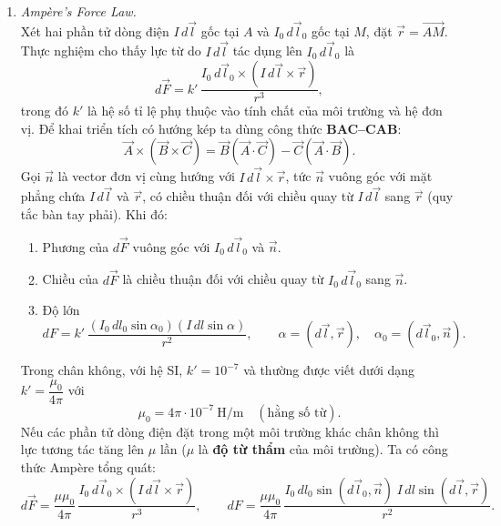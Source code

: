 \begin{enumerate}
\item \textit{Ampère's Force Law.}\\
Xét hai phần tử dòng điện $I\,d\vec{l}$ gốc tại $A$ và $I_0\,d\vec{l}_0$ gốc tại $M$, đặt $\vec{r} = \vec{AM}$. Thực nghiệm cho thấy lực từ do $I\,d\vec{l}$ tác dụng lên $I_0\,d\vec{l}_0$ là
\begin{equation}\label{eq:ampere-force}
d\vec{F} = k'\,\frac{I_0\,d\vec{l}_0 \times \left(I\,d\vec{l} \times \vec{r}\right)}{r^3},
\end{equation}
trong đó $k'$ là hệ số tỉ lệ phụ thuộc vào tính chất của môi trường và hệ đơn vị. Để khai triển tích có hướng kép ta dùng công thức \textbf{BAC--CAB}:
\[
\vec{A} \times (\vec{B} \times \vec{C}) = \vec{B}(\vec{A}\cdot\vec{C}) - \vec{C}(\vec{A}\cdot\vec{B}).
\]
Gọi $\vec{n}$ là vector đơn vị cùng hướng với $I\,d\vec{l} \times \vec{r}$, tức $\vec{n}$ vuông góc với mặt phẳng chứa $I\,d\vec{l}$ và $\vec{r}$, có chiều thuận đối với chiều quay từ $I\,d\vec{l}$ sang $\vec{r}$ (quy tắc bàn tay phải). Khi đó:
\begin{enumerate}
  \item[(a)] Phương của $d\vec{F}$ vuông góc với $I_0\,d\vec{l}_0$ và $\vec{n}$.
  \item[(b)] Chiều của $d\vec{F}$ là chiều thuận đối với chiều quay từ $I_0\,d\vec{l}_0$ sang $\vec{n}$.
  \item[(c)] Độ lớn
  \[
  dF = k'\,\frac{(I_0\,dl_0\sin\alpha_0)(I\,dl\sin\alpha)}{r^2},
  \qquad \alpha = (d\vec{l}, \vec{r}),\quad \alpha_0 = (d\vec{l}_0, \vec{n}).
  \]
\end{enumerate}
Trong chân không, với hệ SI, $k' = 10^{-7}$ và thường được viết dưới dạng $k' = \dfrac{\mu_0}{4\pi}$ với
\[
\mu_0 = 4\pi\cdot 10^{-7}\ \text{H/m} \quad (\text{hằng số từ}).
\]
Nếu các phần tử dòng điện đặt trong một môi trường khác chân không thì lực tương tác tăng lên $\mu$ lần ($\mu$ là \textbf{độ từ thẩm} của môi trường). Ta có công thức Ampère tổng quát:
\[
d\vec{F} = \frac{\mu\mu_0}{4\pi}\,\frac{I_0\,d\vec{l}_0 \times \left(I\,d\vec{l} \times \vec{r}\right)}{r^3},
\qquad
dF = \frac{\mu\mu_0}{4\pi}\,\frac{I_0\,dl_0\sin(d\vec{l}_0,\vec{n})\; I\,dl\sin(d\vec{l},\vec{r})}{r^2}.
\]


\end{enumerate}
